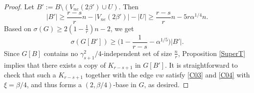 \documentclass[11pt, a4paper]{article}
\theoremstyle{definition}
\newcommand{\<}{\subseteq}
\begin{document}
\begin{proof}
Let $B':=B\setminus (V_{ne}(2\beta')\cup U)$. %
Then $$|B'|\ge \frac{r-s}{r}n-|V_{ne}(2\beta')|-|U|\ge \frac{r-s}{r}n-5r\alpha^{1/4} n.$$
Based on $\sigma(G)\ge2(1- \frac{1}{r})n-2$, we get 
$$\sigma(G[B'])\ge \Big(1-\frac{1}{r-s}-\alpha^{1/5}\Big)|B'|.$$
Since $G[B]$ contains  no $\gamma_{s+1}^2/4$-independent set of size $\frac{n}{r}$, Proposition \ref{SuperT} implies that there exists a copy of $K_{r-s+1}$ in $G[B']$. %
It is straightforward to check that such a $K_{r-s+1}$ together with the edge $vw$ satisfy \ref{C03} and \ref{C04} with $\xi =\beta /4$, and thus forms a $(2,\beta/4)$-base in $G$, as desired. %




\end{proof}
\end{document}
